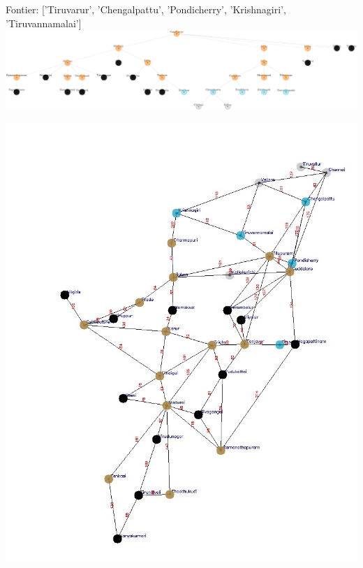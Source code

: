 \documentclass[xcolor=table]{beamer}
\begin{document}
\begin{frame}
  { \tiny Fontier: ['Tiruvarur', 'Chengalpattu', 'Pondicherry', 'Krishnagiri', 'Tiruvannamalai']}
  \includegraphics[width=1\textwidth]{../BFSNodes/40-1.png}
  \begin{center}
    \includegraphics[height=0.6\textheight]{../BFSoutput/tamilBFS38.jpg}
  \end{center}
\end{frame}
\end{document}
